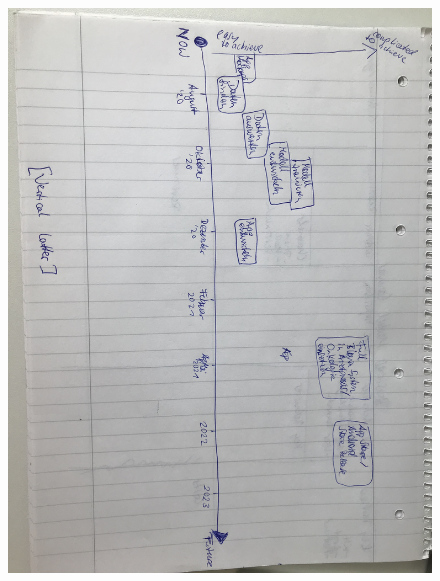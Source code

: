 \begin{figure}[h!]
	\centering
	\includegraphics[width=1\textwidth]{images/verticallatter.jpg}

\end{figure}
